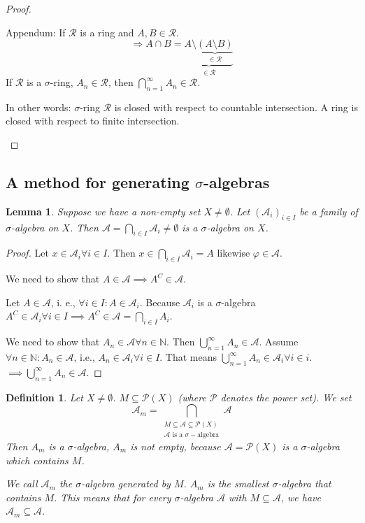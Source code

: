 \documentclass{article}
\newtheorem{definition}{Definition}  \numberwithin{definition}{section}
\newtheorem{lemma}{Lemma}  \numberwithin{lemma}{section}
\begin{document}
\begin{proof}
\begin{enumerate}
      Appendum: If $\mathcal R$ is a ring and $A, B \in \mathcal R$.
      \[ \Rightarrow A \cap B = \underbrace{A \setminus \underbrace{(A \setminus B)}_{\in \mathcal R}}_{\in \mathcal R} \]
      If $\mathcal R$ is a $\sigma$-ring, $A_n \in \mathcal R$, then $\bigcap_{n=1}^\infty A_n \in \mathcal R$.

      In other words:
      $\sigma$-ring $\mathcal R$ is closed with respect to countable intersection.
      A ring is closed with respect to finite intersection.
  \end{enumerate}
\end{proof}

\subsection{A method for generating $\sigma$-algebras}

\begin{lemma}
  \label{l:ten}
  Suppose we have a non-empty set $X \neq \emptyset$. Let $(\mathcal A_i)_{i \in I}$ be a family of $\sigma$-algebra on $X$.
  Then $\mathcal A = \bigcap_{i \in I} \mathcal A_i \neq \emptyset$ is a $\sigma$-algebra on $X$.
\end{lemma}

\begin{proof}
  Let $x \in \mathcal A_i \forall i \in I$. Then $x \in \bigcap_{i \in I} \mathcal A_i = A$ likewise $\varphi \in \mathcal A$.

  We need to show that $A \in \mathcal A \implies A^C \in \mathcal A$.

  Let $A \in \mathcal A$, i. e., $\forall i \in I: A \in \mathcal A_i$.
  Because $\mathcal A_i$ is a $\sigma$-algebra $A^C \in \mathcal A_i \forall i \in I \implies A^C \in \mathcal A = \bigcap_{i \in I} A_i$.

  We need to show that $A_n \in \mathcal A \forall n \in \mathbb N$. Then $\bigcup_{n=1}^\infty A_n \in \mathcal A$.
  Assume $\forall n \in \mathbb N: A_n \in \mathcal A$, i.e., $A_n \in \mathcal A_i \forall i \in I$.
  That means $\bigcup_{n=1}^\infty A_n \in \mathcal A_i \forall i \in i$. $\implies \bigcup_{n=1}^\infty A_n \in \mathcal A$.
\end{proof}

\begin{definition}
  Let $X \neq \emptyset$. $M \subseteq \mathcal P(X)$ (where $\mathcal P$ denotes the power set).
  We set
  \[ \mathcal A_m = \bigcap_{\substack{M \subseteq \mathcal A \subseteq \mathcal P(X) \\ \mathcal{A} \text{ is a } \sigma-\text{algebra}}} \mathcal A \]
  Then $A_m$ is a $\sigma$-algebra, $A_m$ is not empty, because $\mathcal A = \mathcal P(X)$ is a $\sigma$-algebra which contains $M$.

  We call $\mathcal A_m$ the $\sigma$-algebra generated by $M$.
  $A_m$ is the smallest $\sigma$-algebra that contains $M$. This means that for every $\sigma$-algebra $\mathcal A$ with $M \subseteq \mathcal A$, we have $\mathcal A_m \subseteq \mathcal A$.
\end{definition}
\end{document}
